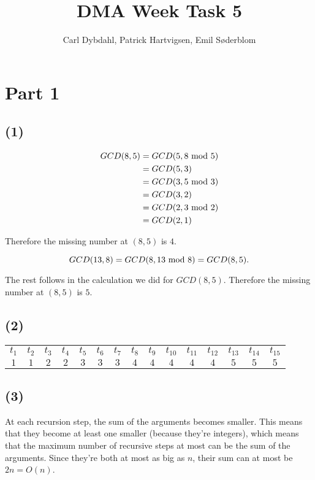 \documentclass[a4paper]{article}
\title{DMA Week Task 5}
\author{Carl Dybdahl, Patrick Hartvigsen, Emil Søderblom}
\begin{document}
\maketitle

\section{Part 1}

\subsection{(1)}

\[
\begin{aligned}
GCD(8, 5) &= GCD(5, 8 \text{ mod } 5) \\ &= GCD(5, 3) \\ &= GCD(3, 5 \text{ mod } 3) \\ &= GCD(3, 2) \\ &= GCD(2, 3 \text{ mod } 2) \\ &= GCD(2, 1)
\end{aligned}
\]

Therefore the missing number at $(8, 5)$ is $4$.

\[
GCD(13, 8) = GCD(8, 13 \text{ mod } 8) = GCD(8, 5).
\]

The rest follows in the calculation we did for $GCD(8, 5)$. Therefore the missing number at $(8, 5)$ is $5$.

\subsection{(2)}

\begin{tabular}{c c c c c c c c c c c c c c c}
$t_1$ & $t_2$ & $t_3$ & $t_4$ & $t_5$ & $t_6$ & $t_7$ & $t_8$ & $t_9$ & $t_{10}$ & $t_{11}$ & $t_{12}$ & $t_{13}$ & $t_{14}$ & $t_{15}$ \\
$1$ & $1$ & $2$ & $2$ & $3$ & $3$ & $3$ & $4$ & $4$ & $4$ & $4$ & $4$ & $5$ & $5$ & $5$
\end{tabular}

\subsection{(3)}

At each recursion step, the sum of the arguments becomes smaller. This means that they become at least one smaller (because they’re integers), which means that the maximum number of recursive steps at most can be the sum of the arguments. Since they’re both at most as big as $n$, their sum can at most be $2n = O(n)$.
\end{document}
